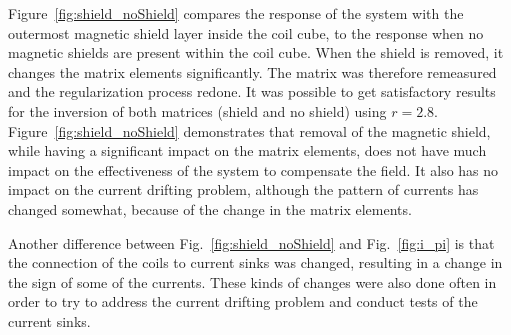 
Figure~\ref{fig:shield_noShield} compares the response of the system
with the outermost magnetic shield layer inside the coil cube, to the
response when no magnetic shields are present within the coil cube.
When the shield is removed, it changes the matrix elements
significantly. The matrix was therefore remeasured and the
regularization process redone.  It was possible to get satisfactory
results for the inversion of both matrices (shield and no shield)
using $r=2.8$.  Figure~\ref{fig:shield_noShield} demonstrates that
removal of the magnetic shield, while having a significant impact on
the matrix elements, does not have much impact on the effectiveness of
the system to compensate the field.  It also has no impact on the
current drifting problem, although the pattern of currents has changed
somewhat, because of the change in the matrix elements.

Another difference between Fig.~\ref{fig:shield_noShield} and
Fig.~\ref{fig:i_pi} is that the connection of the coils to current
sinks was changed, resulting in a change in the sign of some of the
currents.  These kinds of changes were also done often in order to try
to address the current drifting problem and conduct tests of the
current sinks.





